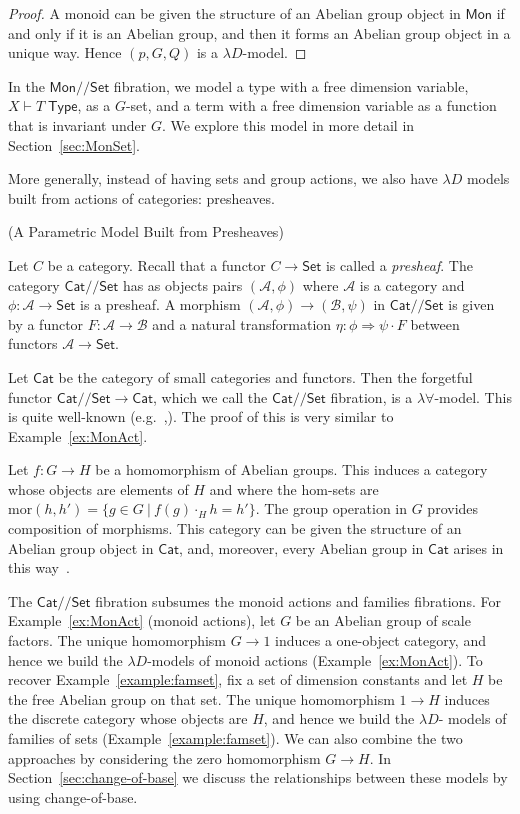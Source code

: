 \documentclass[a4paper,UKenglish]{lipics}
\newcommand{\msf}[1]{\mathsf{#1}} %
\newcommand{\Mon}{\msf{Mon}}
\newcommand{\Set}{\msf{Set}}
\newcommand{\Cat}{\msf{Cat}}
\newcommand{\A}{\mathcal{A}}
\newcommand{\B}{\mathcal{B}}
\newcommand{\GroupSet}[1]{#1/\!/\Set}
\newcommand{\MonSet}{\GroupSet{\Mon}}
\newcommand{\CatSet}{\GroupSet{\Cat}}
\newcommand{\Tj}[2]{#1 \vdash #2 \; \msf{ Type}}
\newcommand{\Dvar}{X}
\begin{document}
\begin{example}
\begin{proof}
A monoid can be given the structure of an Abelian group object in $\Mon$ if and only if it is an Abelian group, and then it forms an Abelian group object in a unique way. Hence $(p,G,Q)$ is a $\lambda D$-model.
\end{proof}

In the $\MonSet$ fibration, we model a type with a free dimension variable, $\Tj\Dvar T$, as a $G$-set, and a term with a free dimension variable as a function that is invariant under $G$. We explore this model in more detail in Section~\ref{sec:MonSet}.
\end{example}

More generally, instead of having sets and group actions, we also have $\lambda D$ models built from actions of categories: presheaves.

\begin{example}(A Parametric Model Built from Presheaves)
\label{ex:presheaves}

Let $C$ be a category. Recall that a functor $C\to\Set$ is called a \emph{presheaf}. The category $\CatSet$ has as objects pairs $(\A,\phi)$ where $\A$ is a category and $\phi:\A\to\Set$ is a presheaf. A morphism $(\A,\phi) \rightarrow (\B,\psi)$ in $\CatSet$ is given by a functor $F:\A\rightarrow \B$ and a natural transformation $\eta:\phi \Rightarrow \psi \cdot F$ between functors $\A \to\Set$.

Let $\Cat$ be the category of small categories and functors. Then the forgetful functor $\CatSet\to \Cat$, which we call the $\CatSet$ fibration, is a $\lambda \forall$-model. This is quite well-known (e.g.~\cite[end of \S 3]{lawvere-adjointness},\cite{mellies-zeilberger}). 
The proof of this is very similar to Example~\ref{ex:MonAct}.

Let $f:G\to H$ be a homomorphism of Abelian groups. This induces a category
whose objects are elements of $H$ and where the hom-sets are $\mathrm{mor}(h,h')=\{g\in G~|~f(g)\cdot_Hh=h'\}$. The group operation in $G$ provides 
composition of morphisms. 
This category can be given the structure of an Abelian group object in 
$\Cat$, and, moreover, every Abelian group in $\Cat$ arises in this way~\cite{brown-spencer}.

The $\CatSet$ fibration subsumes 
the monoid actions and families fibrations.
For Example~\ref{ex:MonAct} (monoid actions), 
let $G$ be an Abelian group of scale factors.
The unique homomorphism $G\to 1$ induces a one-object category, 
and hence we build 
the $\lambda D$-models of monoid actions (Example~\ref{ex:MonAct}).
To recover Example~\ref{example:famset}, 
fix a set of dimension constants and let $H$ be the 
free Abelian group on that set. The unique homomorphism $1\to H$ induces the 
discrete category whose objects are $H$, and hence we build the $\lambda D$-%
models of families of sets (Example~\ref{example:famset}).
We can also combine the two approaches
by considering the zero homomorphism $G\to H$. 
In Section~\ref{sec:change-of-base} we discuss the relationships between these
models by using change-of-base.
\end{example}
\end{document}
